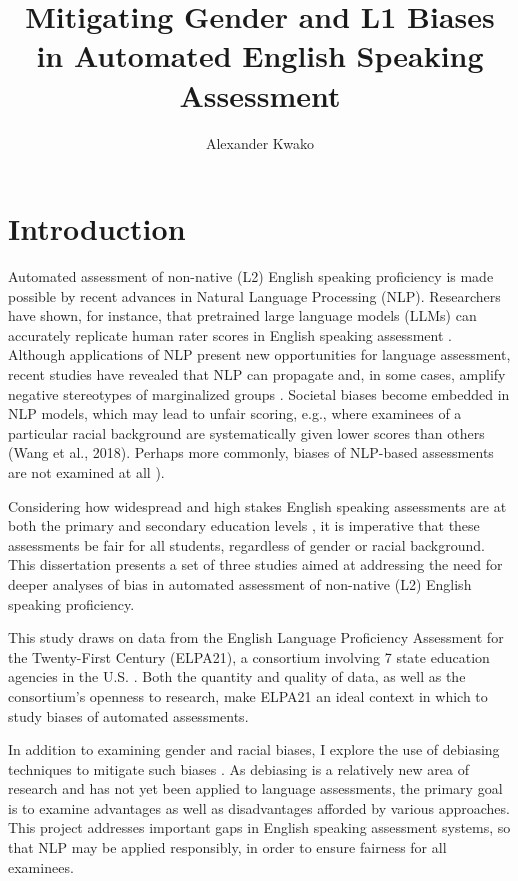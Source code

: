\documentclass [PhD] {uclathes}
\title          {Mitigating Gender and L1 Biases \\
                in Automated English Speaking Assessment}
\author         {Alexander Kwako}
\begin{document}
\makeintropages

%
%

\chapter{Introduction}

Automated assessment of non-native (L2) English speaking proficiency is made possible by recent advances in Natural Language Processing (NLP). Researchers have shown, for instance, that pretrained large language models (LLMs) can accurately replicate human rater scores in English speaking assessment \citep{wang2021automated}. Although applications of NLP present new opportunities for language assessment, recent studies have revealed that NLP can propagate and, in some cases, amplify negative stereotypes of marginalized groups \citep{blodgett2020}. Societal biases become embedded in NLP models, which may lead to unfair scoring, e.g., where examinees of a particular racial background are systematically given lower scores than others (Wang et al., 2018). Perhaps more commonly, biases of NLP-based assessments are not examined at all \citep[e.g.][]{collier2020test, ormerod2022automated}). 

Considering how widespread and high stakes English speaking assessments are at both the primary and secondary education levels \citep{cimpian2017, ets2005}, it is imperative that these assessments be fair for all students, regardless of gender or racial background. This dissertation presents a set of three studies aimed at addressing the need for deeper analyses of bias in automated assessment of non-native (L2) English speaking proficiency. 

This study draws on data from the English Language Proficiency Assessment for the Twenty-First Century (ELPA21), a consortium involving 7 state education agencies in the U.S. \citep{huang2018english}. Both the quantity and quality of data, as well as the consortium’s openness to research, make ELPA21 an ideal context in which to study biases of automated assessments.

In addition to examining gender and racial biases, I explore the use of debiasing techniques to mitigate such biases \citep{sun2019mitigating}. As debiasing is a relatively new area of research and has not yet been applied to language assessments, the primary goal is to examine advantages as well as disadvantages afforded by various approaches. This project addresses important gaps in English speaking assessment systems, so that NLP may be applied responsibly, in order to ensure fairness for all examinees.
\end{document}
